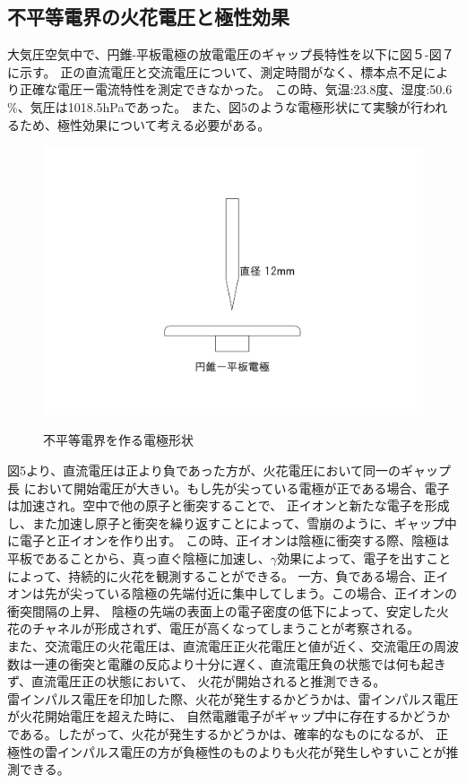 \documentclass[a4j,twocolumn]{jsarticle}
\begin{document}
\subsection*{不平等電界の火花電圧と極性効果}

大気圧空気中で、円錐-平板電極の放電電圧のギャップ長特性を以下に図５-図７に示す。
正の直流電圧と交流電圧について、測定時間がなく、標本点不足により正確な電圧ー電流特性を測定できなかった。
この時、気温:23.8度、湿度:50.6$\%$、気圧は1018.5hPaであった。
また、図5のような電極形状にて実験が行われるため、極性効果について考える必要がある。
\begin{figure}[htb]
    \centering
    \includegraphics[keepaspectratio,width=0.6\columnwidth]{fig/pencil.pdf}
    \caption{不平等電界を作る電極形状}
    \cite{textbook}
\end{figure}

図5より、直流電圧は正より負であった方が、火花電圧において同一のギャップ長
において開始電圧が大きい。もし先が尖っている電極が正である場合、電子は加速され。空中で他の原子と衝突することで、
正イオンと新たな電子を形成し、また加速し原子と衝突を繰り返すことによって、雪崩のように、ギャップ中に電子と正イオンを作り出す。
この時、正イオンは陰極に衝突する際、陰極は平板であることから、真っ直ぐ陰極に加速し、$\gamma$効果によって、電子を出すことによって、持続的に火花を観測することができる。
一方、負である場合、正イオンは先が尖っている陰極の先端付近に集中してしまう。この場合、正イオンの衝突間隔の上昇、
陰極の先端の表面上の電子密度の低下によって、安定した火花のチャネルが形成されず、電圧が高くなってしまうことが考察される。\\
また、交流電圧の火花電圧は、直流電圧正火花電圧と値が近く、交流電圧の周波数は一連の衝突と電離の反応より十分に遅く、直流電圧負の状態では何も起きず、直流電圧正の状態において、
火花が開始されると推測できる。\\
雷インパルス電圧を印加した際、火花が発生するかどうかは、雷インパルス電圧が火花開始電圧を超えた時に、
自然電離電子がギャップ中に存在するかどうかである。したがって、火花が発生するかどうかは、確率的なものになるが、
正極性の雷インパルス電圧の方が負極性のものよりも火花が発生しやすいことが推測できる。
\end{document}
